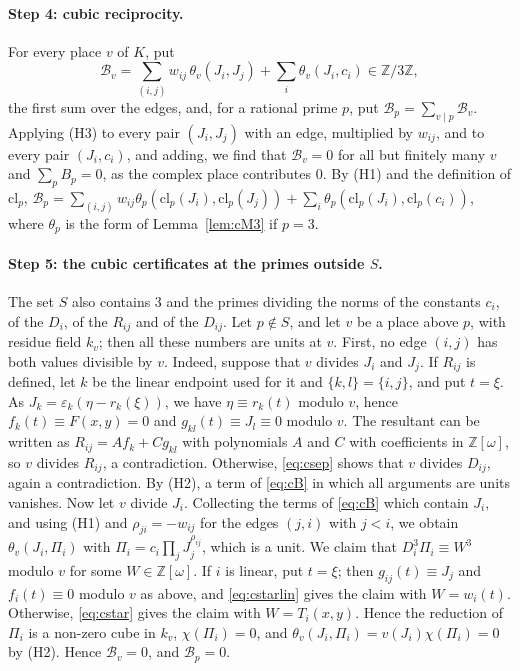 \documentclass[11pt]{article}
\newcommand{\Z}{\mathbb{Z}}
\begin{document}
\paragraph{Step 4: cubic reciprocity.} For every place $v$ of $K$, put
\begin{equation}\label{eq:cB}
\mathcal B_v=\sum_{(i,j)}w_{ij}\,\theta_v(J_i,J_j)+\sum_i\theta_v(J_i,c_i)\in\Z/3\Z,
\end{equation}
the first sum over the edges, and, for a rational prime $p$, put $\mathcal B_p=\sum_{v\mid p}\mathcal B_v$. Applying (H3) to every pair $(J_i,J_j)$ with an edge, multiplied by $w_{ij}$, and to every pair $(J_i,c_i)$, and adding, we find that $\mathcal B_v=0$ for all but finitely many $v$ and $\sum_pB_p=0$, as the complex place contributes $0$. By (H1) and the definition of $\mathrm{cl}_p$, $\mathcal B_p=\sum_{(i,j)}w_{ij}\theta_p(\mathrm{cl}_p(J_i),\mathrm{cl}_p(J_j))+\sum_i\theta_p(\mathrm{cl}_p(J_i),\mathrm{cl}_p(c_i))$, where $\theta_p$ is the form of Lemma~\ref{lem:cM3} if $p=3$.

\paragraph{Step 5: the cubic certificates at the primes outside $S$.} The set $S$ also contains $3$ and the primes dividing the norms of the constants $c_i$, of the $D_i$, of the $R_{ij}$ and of the $D_{ij}$. Let $p\notin S$, and let $v$ be a place above $p$, with residue field $k_v$; then all these numbers are units at $v$. First, no edge $(i,j)$ has both values divisible by $v$. Indeed, suppose that $v$ divides $J_i$ and $J_j$. If $R_{ij}$ is defined, let $k$ be the linear endpoint used for it and $\{k,l\}=\{i,j\}$, and put $t=\xi$. As $J_k=\varepsilon_k(\eta-r_k(\xi))$, we have $\eta\equiv r_k(t)$ modulo $v$, hence $f_k(t)\equiv F(x,y)=0$ and $g_{kl}(t)\equiv J_l\equiv0$ modulo $v$. The resultant can be written as $R_{ij}=Af_k+Cg_{kl}$ with polynomials $A$ and $C$ with coefficients in $\Z[\omega]$, so $v$ divides $R_{ij}$, a contradiction. Otherwise, \eqref{eq:csep} shows that $v$ divides $D_{ij}$, again a contradiction. By (H2), a term of \eqref{eq:cB} in which all arguments are units vanishes. Now let $v$ divide $J_i$. Collecting the terms of \eqref{eq:cB} which contain $J_i$, and using (H1) and $\rho_{ji}=-w_{ij}$ for the edges $(j,i)$ with $j<i$, we obtain $\theta_v(J_i,\Pi_i)$ with $\Pi_i=c_i\prod_jJ_j^{\rho_{ij}}$, which is a unit. We claim that $D_i^3\Pi_i\equiv W^3$ modulo $v$ for some $W\in\Z[\omega]$. If $i$ is linear, put $t=\xi$; then $g_{ij}(t)\equiv J_j$ and $f_i(t)\equiv0$ modulo $v$ as above, and \eqref{eq:cstarlin} gives the claim with $W=w_i(t)$. Otherwise, \eqref{eq:cstar} gives the claim with $W=T_i(x,y)$. Hence the reduction of $\Pi_i$ is a non-zero cube in $k_v$, $\chi(\Pi_i)=0$, and $\theta_v(J_i,\Pi_i)=v(J_i)\chi(\Pi_i)=0$ by (H2). Hence $\mathcal B_v=0$, and $\mathcal B_p=0$.
\end{document}
